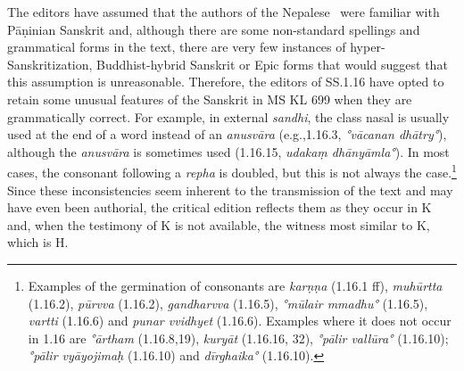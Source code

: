 The editors have assumed that the authors of the Nepalese \SS\ were familiar 
with Pāṇinian Sanskrit and, although there are some non-standard spellings and 
grammatical forms in the text, there are very few instances of 
hyper-Sanskritization, Buddhist-hybrid Sanskrit or Epic forms that would suggest 
that this assumption is unreasonable. Therefore, the editors of SS.1.16 have 
opted to retain some unusual features of the Sanskrit in MS KL 699 when they are 
grammatically correct. For example, in external \emph{sandhi}, the class nasal is 
usually used at the end of a word instead of an \emph{anusvāra} (e.g.,1.16.3, 
\emph{°vācanan dhātry°}), although the \emph{anusvāra} is sometimes used 
(1.16.15, \emph{udakaṃ dhānyāmla°}). In most cases, the consonant following a 
\emph{repha} is doubled, but this is not always the case.\footnote{Examples of 
the germination of consonants are \emph{karṇṇa} (1.16.1 ff), \emph{muhūrtta} 
(1.16.2), \emph{pūrvva} (1.16.2), \emph{gandharvva} (1.16.5), \emph{°mūlair 
mmadhu°} (1.16.5), \emph{vartti} (1.16.6) and \emph{punar vvidhyet} (1.16.6). 
Examples where it does not occur in 1.16 are  \emph{°ārtham} (1.16.8,19), 
\emph{kuryāt} (1.16.16, 32), \emph{°pālir vallūra°} (1.16.10); \emph{°pālir 
vyāyojimaḥ} (1.16.10) and \emph{dīrghaika°} (1.16.10).} Since these 
inconsistencies seem inherent to the transmission of the text and may have even 
been authorial, the critical edition reflects them as they occur in K and, when the 
testimony of K is not available, the witness most similar to K, which is H.





